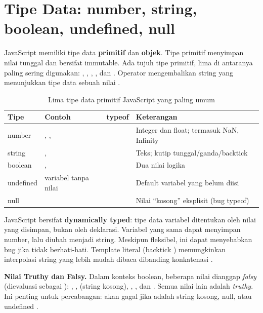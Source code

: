 \section{Tipe Data: number, string, boolean, undefined, null}

JavaScript memiliki tipe data \textbf{primitif} dan \textbf{objek}. Tipe primitif menyimpan nilai tunggal dan bersifat immutable. Ada tujuh tipe primitif, lima di antaranya paling sering digunakan: , , , , dan . Operator  mengembalikan string yang menunjukkan tipe data sebuah nilai \cite{jsInfo}.

\begin{table}[htbp]
\centering
\begin{tabular}{|P{2cm}|P{3cm}|P{3cm}|P{4cm}|}
\hline
\textbf{Tipe} & \textbf{Contoh} & \textbf{typeof} & \textbf{Keterangan} \\
\hline
number & , ,  &  & Integer dan float; termasuk NaN, Infinity \\
\hline
string & ,  &  & Teks; kutip tunggal/ganda/backtick \\
\hline
boolean & ,  &  & Dua nilai logika \\
\hline
undefined & variabel tanpa nilai &  & Default variabel yang belum diisi \\
\hline
null &  &  & Nilai ``kosong'' eksplisit (bug typeof) \\
\hline
\end{tabular}
\caption{Lima tipe data primitif JavaScript yang paling umum}
\end{table}

JavaScript bersifat \textbf{dynamically typed}: tipe data variabel ditentukan oleh nilai yang disimpan, bukan oleh deklarasi. Variabel yang sama dapat menyimpan number, lalu diubah menjadi string. Meskipun fleksibel, ini dapat menyebabkan bug jika tidak berhati-hati. Template literal (backtick ) memungkinkan interpolasi string yang lebih mudah dibaca dibanding konkatenasi \cite{mdnJsGuide}.

\begin{catatan}
\textbf{Nilai Truthy dan Falsy.} Dalam konteks boolean, beberapa nilai dianggap \textit{falsy} (dievaluasi sebagai ): , ,  (string kosong), , , dan . Semua nilai lain adalah \textit{truthy}. Ini penting untuk percabangan:  akan gagal jika  adalah string kosong, null, atau undefined \cite{jsInfo}.
\end{catatan}

